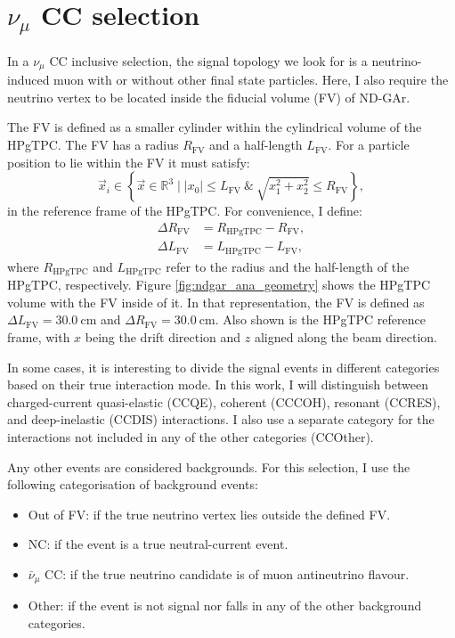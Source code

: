 \section[\texorpdfstring{$\nu_{\mu}$}{numu} CC selection]{\boldmath\texorpdfstring{$\nu_{\mu}$}{numu} CC selection}

In a $\nu_{\mu}$ CC inclusive selection, the signal topology we look for is a neutrino-induced muon with or without other final state particles. Here, I also require the neutrino vertex to be located inside the fiducial volume (FV) of ND-GAr.

The FV is defined as a smaller cylinder within the cylindrical volume of the HPgTPC. The FV has a radius $R_{\mathrm{FV}}$ and a half-length $L_{\mathrm{FV}}$. For a particle position to lie within the FV it must satisfy:
\begin{equation}
    \vec{x}_{i} \in \left\{\vec{x} \in \mathbb{R}^{3} \mid |x_{0}| \leq L_{\mathrm{FV}} ~ \& ~ \sqrt{x_{1}^{2}+x_{2}^{2}} \leq R_{\mathrm{FV}}\right\},
\end{equation}
in the reference frame of the HPgTPC. For convenience, I define:
\begin{equation}
    \begin{split}
        \Delta R_{\mathrm{FV}} &= R_{\mathrm{HPgTPC}} - R_{\mathrm{FV}}, \\
        \Delta L_{\mathrm{FV}} &= L_{\mathrm{HPgTPC}} - L_{\mathrm{FV}},
    \end{split}
\end{equation}
where $R_{\mathrm{HPgTPC}}$ and $L_{\mathrm{HPgTPC}}$ refer to the radius and the half-length of the HPgTPC, respectively. Figure \ref{fig:ndgar_ana_geometry} shows the HPgTPC volume with the FV inside of it. In that representation, the FV is defined as $\Delta L_{\mathrm{FV}} = 30.0 ~ \mathrm{cm}$ and $\Delta R_{\mathrm{FV}} = 30.0 ~ \mathrm{cm}$. Also shown is the HPgTPC reference frame, with $x$ being the drift direction and $z$ aligned along the beam direction.

In some cases, it is interesting to divide the signal events in different categories based on their true interaction mode. In this work, I will distinguish between charged-current quasi-elastic (CCQE), coherent (CCCOH), resonant (CCRES), and deep-inelastic (CCDIS) interactions. I also use a separate category for the interactions not included in any of the other categories (CCOther).

Any other events are considered backgrounds. For this selection, I use the following categorisation of background events:
\begin{itemize}
    \item Out of FV: if the true neutrino vertex lies outside the defined FV.
    \item NC: if the event is a true neutral-current event.
    \item $\bar{\nu}_{\mu}$ CC: if the true neutrino candidate is of muon antineutrino flavour.
    \item Other: if the event is not signal nor falls in any of the other background categories.
\end{itemize}

